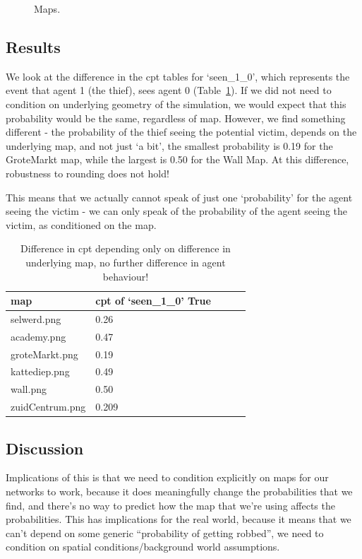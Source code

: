 \begin{figure}[htbp]
\caption{Maps.}
\label{maps}
\end{figure}


\subsection{Results}

We look at the difference in the cpt tables for `seen\_1\_0', which represents the event that agent 1 (the thief), sees agent 0 (Table~\ref{mapstab}). If we did not need to condition on underlying geometry of the simulation, we would expect that this probability would be the same, regardless of map. However, we find something different - the probability of the thief seeing the potential victim, depends on the underlying map, and not just `a bit', the smallest probability is 0.19 for the GroteMarkt map, while the largest is 0.50 for the Wall Map. At this difference, robustness to rounding does not hold!

This means that we actually cannot speak of just one `probability' for the agent seeing the victim - we can only speak of the probability of the agent seeing the victim, as conditioned on the map. 

\begin{table}[]
\begin{tabular}{lllll}
map & cpt of `seen\_1\_0' True \\
\hline
selwerd.png &0.26\\
academy.png & 0.47\\
groteMarkt.png  &0.19\\
kattediep.png &0.49\\
wall.png &0.50\\
zuidCentrum.png & 0.209\\
\end{tabular}
\caption{Difference in cpt depending only on difference in underlying map, no further difference in agent behaviour!}
\label{mapstab}
\end{table}

\subsection{Discussion}
Implications of this is that we need to condition explicitly on maps for our networks to work, because it does meaningfully change the probabilities that we find, and there's no way to predict how the map that we're using affects the probabilities. This has implications for the real world, because it means that we can't depend on some generic ``probability of getting robbed'', we need to condition on spatial conditions/background world assumptions.


